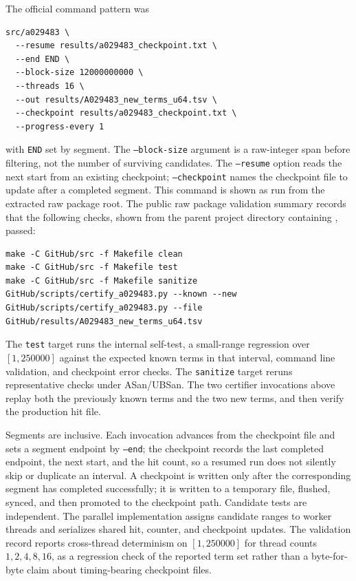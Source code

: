\documentclass[11pt]{article}
\theoremstyle{definition}
\theoremstyle{remark}
\begin{document}
The official command pattern was
\begin{verbatim}
src/a029483 \
  --resume results/a029483_checkpoint.txt \
  --end END \
  --block-size 12000000000 \
  --threads 16 \
  --out results/A029483_new_terms_u64.tsv \
  --checkpoint results/a029483_checkpoint.txt \
  --progress-every 1
\end{verbatim}
with \texttt{END} set by segment.  The \texttt{--block-size} argument is a
raw-integer span before filtering, not the number of surviving candidates.
The \texttt{--resume} option reads the next start from an existing checkpoint;
\texttt{--checkpoint} names the checkpoint file to update after a completed
segment.  This command is shown as run from the extracted raw package root.
The public raw package validation summary records that the following checks,
shown from the parent project directory containing , passed:
\begin{verbatim}
make -C GitHub/src -f Makefile clean
make -C GitHub/src -f Makefile test
make -C GitHub/src -f Makefile sanitize
GitHub/scripts/certify_a029483.py --known --new
GitHub/scripts/certify_a029483.py --file GitHub/results/A029483_new_terms_u64.tsv
\end{verbatim}
The \texttt{test} target runs the internal self-test, a small-range regression
over \([1,250000]\) against the expected known terms in that interval, command
line validation, and checkpoint error checks.  The \texttt{sanitize} target
reruns representative checks under ASan/UBSan.  The two certifier invocations
above replay both the previously known terms and the two new terms, and then
verify the production hit file.

Segments are inclusive.  Each invocation advances from the checkpoint file and
sets a segment endpoint by \texttt{--end}; the checkpoint records the last
completed endpoint, the next start, and the hit count, so a resumed run does
not silently skip or duplicate an interval.  A checkpoint is written only
after the corresponding segment has completed successfully; it is written to a
temporary file, flushed, synced, and then promoted to the checkpoint path.
Candidate tests are independent.  The parallel implementation assigns
candidate ranges to worker threads and serializes shared hit, counter, and
checkpoint updates.  The validation record reports cross-thread determinism on
\([1,250000]\) for thread counts \(1,2,4,8,16\), as a regression check of the
reported term set rather than a byte-for-byte claim about timing-bearing
checkpoint files.
\end{document}
